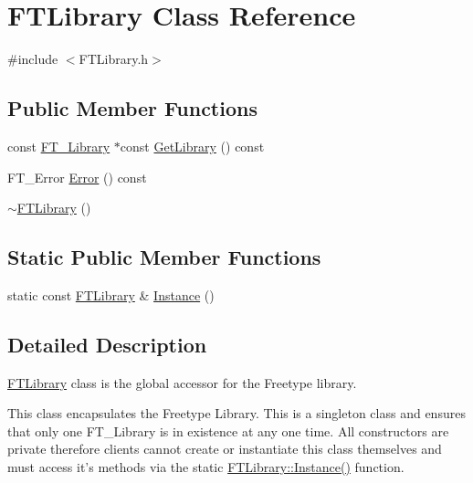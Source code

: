 \hypertarget{class_f_t_library}{\section{F\-T\-Library Class Reference}
\label{class_f_t_library}
}


{\ttfamily \#include $<$F\-T\-Library.\-h$>$}

\subsection*{Public Member Functions}
\begin{DoxyCompactItemize}
\item 
const \hyperlink{struct_f_t___library_rec__}{F\-T\-\_\-\-Library} $\ast$const \hyperlink{class_f_t_library_afef4db019eae5a4307201b7abc6a88c7}{Get\-Library} () const 
\item 
F\-T\-\_\-\-Error \hyperlink{class_f_t_library_ad01e538ba8e308dddda5c4ec808ee404}{Error} () const 
\item 
\hyperlink{class_f_t_library_a8d1ee3dc3c4916b5b428e934dc46e9d7}{$\sim$\-F\-T\-Library} ()
\end{DoxyCompactItemize}
\subsection*{Static Public Member Functions}
\begin{DoxyCompactItemize}
\item 
static const \hyperlink{class_f_t_library}{F\-T\-Library} \& \hyperlink{class_f_t_library_aa172665a8db8888851895bcb15aa8103}{Instance} ()
\end{DoxyCompactItemize}


\subsection{Detailed Description}
\hyperlink{class_f_t_library}{F\-T\-Library} class is the global accessor for the Freetype library.

This class encapsulates the Freetype Library. This is a singleton class and ensures that only one F\-T\-\_\-\-Library is in existence at any one time. All constructors are private therefore clients cannot create or instantiate this class themselves and must access it's methods via the static {\ttfamily \hyperlink{class_f_t_library_aa172665a8db8888851895bcb15aa8103}{F\-T\-Library\-::\-Instance()}} function.


